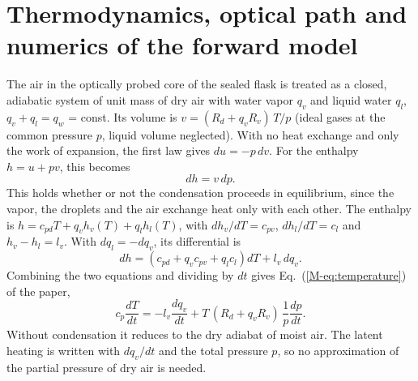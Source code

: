 \documentclass[12pt]{article}
\begin{document}
\section{Thermodynamics, optical path and numerics of the forward model}
\label{sec:s-thermo}
The air in the optically probed core of the sealed flask is treated as a closed, adiabatic system of
unit mass of dry air with water vapor $q_v$ and liquid water $q_l$, $q_v + q_l = q_w$ = const. Its
volume is $v = (R_d + q_v R_v)\,T/p$ (ideal gases at the common pressure $p$, liquid volume
neglected). With no heat exchange and only the work of expansion, the first law gives $du = -p\,dv$. For the
enthalpy $h = u + pv$, this becomes
\begin{equation}
dh = v\,dp .
\label{eq:s-first-law}
\end{equation}
This holds whether or not the condensation proceeds in equilibrium, since the vapor, the droplets and
the air exchange heat only with each other. The enthalpy is
$h = c_{pd}T + q_v h_v(T) + q_l h_l(T)$, with $dh_v/dT = c_{pv}$, $dh_l/dT = c_l$ and
$h_v - h_l = l_v$. With $dq_l = -dq_v$, its differential is
\begin{equation}
dh = \left(c_{pd} + q_v c_{pv} + q_l c_l\right) dT + l_v\,dq_v .
\end{equation}
Combining the two equations and dividing by $dt$ gives Eq.~(\ref{M-eq:temperature}) of the paper,
\begin{equation}
c_p \frac{dT}{dt} = -l_v \frac{dq_v}{dt} + T\,(R_d + q_v R_v)\,\frac{1}{p}\frac{dp}{dt} .
\end{equation}
Without condensation it reduces to the dry adiabat of moist air. The latent heating is written with
$dq_v/dt$ and the total pressure $p$, so no approximation of the partial pressure of dry air is needed.
\end{document}
